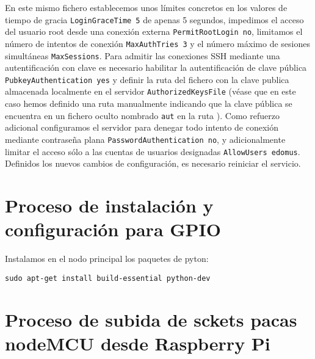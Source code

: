 \vspace{1cm}

En este mismo fichero establecemos unos límites concretos en los valores de tiempo de gracia \verb|LoginGraceTime 5| de apenas 5 segundos, impedimos el acceso del usuario root desde una conexión externa \verb|PermitRootLogin no|, limitamos el número de intentos de conexión \verb|MaxAuthTries 3| y el número máximo de sesiones simultáneas \verb|MaxSessions|. Para admitir las conexiones SSH mediante una autentificación con clave es necesario habilitar la autentificación de clave pública \verb|PubkeyAuthentication yes| y definir la ruta del fichero con la clave publica almacenada localmente en el servidor \verb|AuthorizedKeysFile|  (véase que en este caso hemos definido una ruta manualmente indicando que la clave pública se encuentra en un fichero oculto nombrado \verb|aut| en la ruta ). Como refuerzo adicional configuramos el servidor para denegar todo intento de conexión mediante contraseña plana \verb|PasswordAuthentication no|, y adicionalmente limitar el acceso sólo a las cuentas de usuarios designadas \verb|AllowUsers edomus|. Definidos los nuevos cambios de configuración, es necesario reiniciar el servicio.

\section{Proceso de instalación y configuración para GPIO}
\label{AppendiA:Key3}


Instalamos en el nodo principal los paquetes de pyton:
\begin{verbatim}
sudo apt-get install build-essential python-dev
\end{verbatim}

\section{Proceso de subida de sckets pacas nodeMCU desde Raspberry Pi}
\label{AppendiA:Key4}
